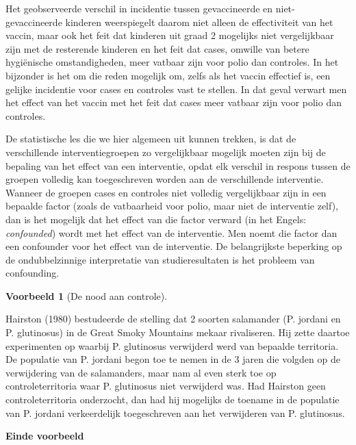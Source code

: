 \documentclass[
  12pt,dutch,coursenotes]{book}
\theoremstyle{definition}
\theoremstyle{definition}
\newtheorem{example}{Voorbeeld}[chapter]
\theoremstyle{definition}
\theoremstyle{remark}
\begin{document}
Het geobserveerde verschil in incidentie tussen gevaccineerde en
niet-gevaccineerde kinderen weerspiegelt daarom niet alleen de effectiviteit
van het vaccin, maar ook het feit dat kinderen uit graad 2 mogelijks niet
vergelijkbaar zijn met de resterende kinderen en het feit dat cases, omwille
van betere hygiënische omstandigheden, meer vatbaar zijn voor polio dan
controles. In het bijzonder is het om die reden mogelijk om, zelfs als het
vaccin effectief is, een gelijke incidentie voor cases en controles vast te
stellen. In dat geval verwart men het effect van het vaccin met het feit dat
cases meer vatbaar zijn voor polio dan controles.

De statistische les die we hier algemeen uit kunnen trekken, is dat de
verschillende interventiegroepen zo vergelijkbaar mogelijk moeten zijn bij
de bepaling van het effect van een interventie, opdat elk verschil in respons tussen
de groepen volledig kan toegeschreven worden aan de verschillende
interventie. Wanneer de groepen cases en controles niet volledig
vergelijkbaar zijn in een bepaalde factor (zoals de vatbaarheid voor polio,
maar niet de interventie zelf), dan is het mogelijk dat het effect van die
factor verward (in het Engels: \emph{confounded}) wordt met het effect van
de interventie. Men noemt die factor dan een confounder voor het effect van
de interventie. De belangrijkste beperking op de ondubbelzinnige interpretatie van studieresultaten is het probleem van confounding.

\begin{example}[De nood aan controle]
\protect\hypertarget{exm:unnamed-chunk-66}{}{\label{exm:unnamed-chunk-66} \iffalse (De nood aan controle) \fi{} }
\end{example}
Hairston (1980) bestudeerde de stelling dat 2 soorten salamander (P. jordani en P. glutinosus) in de Great Smoky Mountains mekaar rivaliseren. Hij zette daartoe experimenten op waarbij P. glutinosus verwijderd werd van bepaalde territoria. De populatie van P. jordani begon toe te nemen in de 3 jaren die volgden op de verwijdering van de salamanders, maar nam al even sterk toe op controleterritoria waar P. glutinosus niet verwijderd was. Had Hairston geen controleterritoria onderzocht, dan had hij mogelijks de toename in de populatie van P. jordani verkeerdelijk toegeschreven aan het verwijderen van P. glutinosus.

\textbf{Einde voorbeeld}
\end{document}
